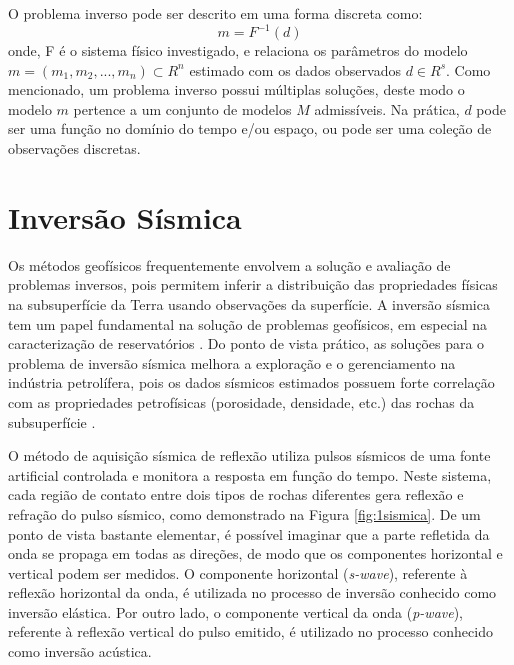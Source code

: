 O problema inverso pode ser descrito em uma forma discreta como:
\begin{equation}
\label{eq:deqgm}
m = F^{-1}(d)
\end{equation}
onde, F é o sistema físico investigado, e relaciona os parâmetros do modelo $m=(m_1, m_2,...,m_n) \subset R^n$
estimado com os dados observados $d \in R^s$.
Como mencionado, um problema inverso possui múltiplas soluções,
deste modo o modelo $m$ pertence a um conjunto de modelos $M$ admissíveis.
Na prática, $d$ pode ser uma função no domínio do tempo e/ou espaço, ou pode ser
uma coleção de observações discretas.

\section{Inversão Sísmica}

Os métodos geofísicos frequentemente envolvem a solução e avaliação de problemas inversos,
pois permitem inferir a distribuição das propriedades físicas na subsuperfície da Terra
usando observações da superfície. A inversão sísmica tem um papel fundamental na solução 
de problemas geofísicos, em especial na caracterização de reservatórios \cite{Bosch2010} \cite{Srivastava2009}.
Do ponto de vista prático, as soluções para o problema de inversão sísmica melhora a exploração e
o gerenciamento na indústria petrolífera, pois os dados sísmicos estimados possuem forte correlação com as
propriedades petrofísicas (porosidade, densidade, etc.) das rochas da subsuperfície \cite{Figueiredo2014}.

O método de aquisição sísmica de reflexão utiliza
pulsos sísmicos de uma fonte artificial controlada e monitora a resposta em
função do tempo. Neste sistema, cada região de contato entre dois tipos de rochas
diferentes gera reflexão e refração do pulso sísmico, como demonstrado na Figura
\ref{fig:1sismica}.
De um ponto de vista bastante elementar, é possível imaginar que a parte refletida da onda se
propaga em todas as direções, de modo que os componentes horizontal e vertical podem ser medidos.
O componente horizontal (\textit{s-wave}), referente à reflexão horizontal
da onda, é utilizada no processo de inversão conhecido como inversão elástica. Por outro lado, o componente
vertical da onda (\textit{p-wave}), referente à reflexão vertical do pulso emitido, é utilizado no processo
conhecido como inversão acústica.

